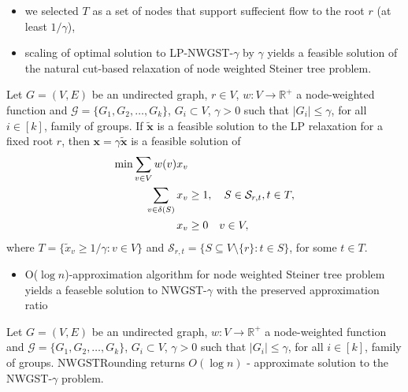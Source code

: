 \documentclass{beamer}
\begin{document}
\begin{frame}{\insertsection}{\insertsubsection}
\begin{itemize}
    \item we selected $T$ as a set of nodes that support suffecient flow to the root $r$ (at least $1/\gamma$),
    \item scaling of \alert{optimal solution} to LP-NWGST-$\gamma$ by $\gamma$ yields a \alert{feasible solution} of the natural cut-based relaxation of node weighted Steiner tree problem.
\end{itemize}
\end{frame}
\begin{frame}{\insertsection}{\insertsubsection}
    \begin{lemma}{}
        Let $G=\left(V,E\right)$ be an undirected graph, $r\in V$, $w:V\rightarrow\mathbb{R}^+$ a node-weighted function and $\mathcal{G}=\{G_1,G_2,\ldots,G_k\}$, $G_i\subset V$, $\gamma>0$ such that $\left|G_i\right|\le\gamma$, for all $i\in\left[k\right]$, family of groups. If $\widetilde{\mathbf{x}}$ is a feasible solution to the LP relaxation for a fixed root $r$, then $\mathbf{x}=\gamma\widetilde{\mathbf{x}}$ is a feasible solution of
        \begin{align*}
            \mbox{min} \sum_{v\in V}w(v)x_v&\notag\\
            \sum_{v\in \delta(S)} x_v  &\geq 1, \quad S\in \mathcal{S}_{r,t}, t\in T,\\
            x_v & \geq 0 \quad v\in V,
        \end{align*}
        where $T=\{\widetilde{x}_v\geq 1/\gamma:v\in V\}$ and $\mathcal{S}_{r,t}=\{S\subseteq V\setminus\{r\}:t\in S\}$, for some $t\in T$.
    \end{lemma}
\end{frame}

\begin{frame}{\insertsection}{\insertsubsection}
    \begin{itemize}
        \item O($\log n$)-approximation algorithm for node weighted Steiner tree problem yields a feaseble solution to NWGST-$\gamma$ with the preserved approximation ratio
    \end{itemize}

    \begin{theorem}
        Let $G=\left(V,E\right)$ be an undirected graph, $w:V\rightarrow\mathbb{R}^+$ a node-weighted function and $\mathcal{G}=\{G_1,G_2,\ldots,G_k\}$, $G_i\subset V$, $\gamma>0$ such that $\left|G_i\right|\le\gamma$, for all $i\in\left[k\right]$, family of groups. $\mathrm{NWGSTRounding}$ returns $O\left(\log{n}\right)$ - approximate solution to the NWGST-$\gamma$ problem.
    \end{theorem}
\end{frame}
\end{document}
